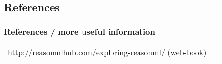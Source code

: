 \documentclass{beamer}
\begin{document}
\begin{frame}
  \section{References}
  \frametitle{References / more useful information}
  \pause
    \begin{tabular}{ | l | p{5cm} |}
      \hline
      \item http://reasonmlhub.com/exploring-reasonml/ (web-book)
    \end{tabular}
\end{frame}
\end{document}
